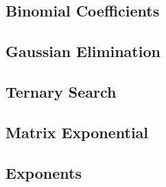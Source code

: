 \documentclass[twocolumn]{article}
\begin{document}
        \subsection{Binomial Coefficients}
        
        \subsection{Gaussian Elimination}
        
        \subsection{Ternary Search}
        
        \subsection{Matrix Exponential}
        
        \subsection{Exponents}
        
\end{document}
